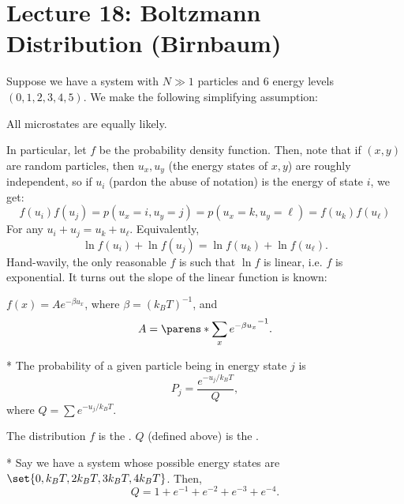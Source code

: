 \section*{Lecture 18: Boltzmann Distribution (Birnbaum)}
\setcounter{section}{18}

Suppose we have a system with $N \gg 1$ particles and $6$ energy levels $(0, 1, 2, 3, 4, 5)$.
We make the following simplifying assumption:

\begin{law}
	All microstates are equally likely.
\end{law}

In particular, let $f$ be the probability density function. Then, note that if $(x,y)$ are random particles, then $u_x, u_y$ (the energy states of $x,y$) are roughly independent, so if $u_i$ (pardon the abuse of notation) is the energy of state $i$, we get: \[
	f(u_i)f(u_j) = p(u_x = i, u_y = j) = p(u_x = k, u_y = \ell) = f(u_k)f(u_\ell)
\]
For any $u_i + u_j = u_k + u_\ell$. Equivalently, \[
	\ln f(u_i) + \ln f(u_j) = \ln f(u_k) + \ln f(u_\ell).
\]
Hand-wavily, the only reasonable $f$ is such that $\ln f$ is linear, i.e. $f$ is exponential. It turns out the slope of the linear function is known:

\begin{thm}
	$f(x) = Ae^{-\beta u_x}$, where $\beta = (k_BT)^{-1}$, and \[
		A = \parens*{\sum_x e^{-\beta u_x}}^{-1}.
	\]
\end{thm}

\begin{cor}*
	The probability of a given particle being in energy state $j$ is \[
		P_j = \frac{e^{-u_j/k_BT}}{Q},
	\]
	where $Q = \sum e^{-u_j/k_BT}$.
\end{cor}

\begin{defn}
	The distribution $f$ is the . $Q$ (defined above) is the .
\end{defn}

\begin{exm}*
	Say we have a system whose possible energy states are $\set{0, k_BT, 2k_BT, 3k_BT, 4k_BT}$.
	Then, \[
		Q = 1 + e^{-1} + e^{-2} + e^{-3} + e^{-4}.
	\]
\end{exm}	

